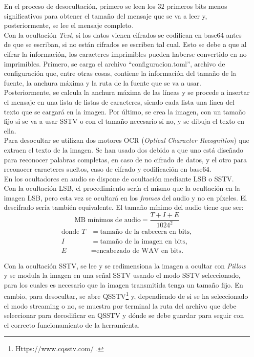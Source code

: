En el proceso de desocultación, primero se leen los 32 primeros bits menos significativos para obtener el tamaño del mensaje que se va a leer y, posteriormente, se lee el mensaje completo. \\

Con la ocultación \textit{Text}, si los datos vienen cifrados se codifican en base64 antes de que se escriban, si no están cifrados se escriben tal cual. Esto se debe a que al cifrar la información, los caracteres imprimibles pueden haberse convertido en no imprimibles. Primero, se carga el archivo ``configuracion.toml'', archivo de configuración que, entre otras cosas, contiene la información del tamaño de la fuente, la anchura máxima y la ruta de la fuente que se va a usar. Posteriormente, se calcula la  anchura máxima de las líneas y se procede a insertar el mensaje en una lista de listas de caracteres, siendo cada lista una línea del texto que se cargará en la imagen. Por último, se crea la imagen, con un tamaño fijo si se va a usar SSTV o con el tamaño necesario si no, y se dibuja el texto en ella.\\ 

Para desocultar se utilizan dos motores OCR (\textit{Optical Character Recognition}) que extraen el texto de la imagen. Se han usado dos debido a que uno está diseñado para reconocer palabras completas, en caso de no cifrado de datos, y el otro para reconocer caracteres sueltos, caso de cifrado y codificación en base64. \\

En los ocultadores en audio se dispone de ocultación mediante LSB o SSTV.\\
Con la ocultación LSB, el procedimiento sería el mismo que la ocultación en la imagen LSB, pero esta vez se ocultará en los \textit{frames} del audio y no en píxeles. El descifrado sería también equivalente. El tamaño mínimo del audio tiene que ser:\\ 
\[
\text{MB mínimos de audio} = \frac{T + I + E}{1024^2}
\]
\[
\begin{aligned}
\text{donde } T &= \text{tamaño de la cabecera en bits}, \\
I &= \text{tamaño de la imagen en bits}, \\
E &= \text{encabezado de WAV en bits.}
\end{aligned}
\]


Con la ocultación SSTV, se lee y se redimensiona la imagen a ocultar con \textit{Pillow} y se modula la imagen en una señal SSTV usando el modo SSTV seleccionado, para los cuales es necesario que la imagen transmitida tenga un tamaño fijo. En cambio, para desocultar, se abre QSSTV\footnote{Https://www.cqsstv.com/ .} y, dependiendo de si se ha seleccionado el modo streaming o no, se muestra por terminal la ruta del archivo que debe seleccionar para decodificar en QSSTV y dónde se debe guardar para seguir con el correcto funcionamiento de la herramienta.\\

